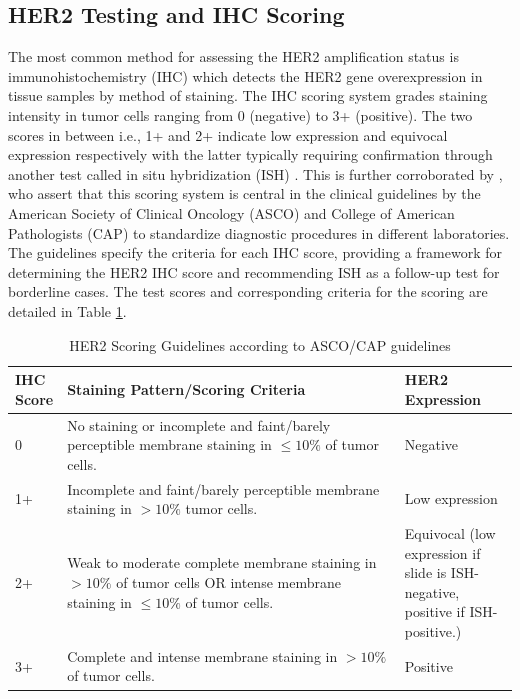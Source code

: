 \subsection{HER2 Testing and IHC Scoring}

The most common method for assessing the HER2 amplification status is immunohistochemistry (IHC) which detects the HER2 gene overexpression in tissue samples by method of staining. The IHC scoring system grades staining intensity in tumor cells ranging from 0 (negative) to 3+ (positive). The two scores in between i.e., 1+ and 2+ indicate low expression and equivocal expression respectively with the latter typically requiring confirmation through another test called in situ hybridization (ISH) \parencite{Ivanova2024StandardizedCancer.}. This is further corroborated by  \textcite{Wolff2018HumanUpdate}, who assert that this scoring system is central in the clinical guidelines by the American Society of Clinical Oncology (ASCO) and College of American Pathologists (CAP) to standardize diagnostic procedures in different laboratories. The guidelines specify the criteria for each IHC score, providing a framework for determining the HER2 IHC  score and recommending ISH as a follow-up test for borderline cases. The test scores and corresponding criteria for the scoring are detailed in Table \ref{tab:HER2 IHC Scoring Guidelines}. 

\begin{table}[H]
\begin{center}
\begin{tabular}{|p{0.07\linewidth}|>{\raggedright\arraybackslash}p{0.7\linewidth}|>{\raggedright\arraybackslash}p{0.23\linewidth}|}
\hline 
\textbf{IHC Score}& \textbf{Staining Pattern/Scoring Criteria}& \textbf{HER2 Expression}\\ \hline 
0& No staining or incomplete and faint/barely perceptible membrane staining in $\leq 10 \% $ of tumor cells.& Negative\\ \hline
1+& Incomplete and faint/barely perceptible membrane staining in $> 10\%$ tumor cells.&  Low expression\\ \hline
2+& Weak to moderate complete membrane staining in $>10\%$ of tumor cells OR intense membrane staining in $\leq 10\%$ of tumor cells.& Equivocal (low expression if slide is ISH-negative, positive if ISH-positive.)\\ \hline
 3+& Complete and intense membrane staining in $> 10\%$ of tumor cells.&Positive\\\hline
\end{tabular}
\caption[HER2 Scoring Guidelines]{HER2 Scoring Guidelines according to ASCO/CAP guidelines \parencite{Ivanova2024StandardizedCancer.}}\label{tab:HER2 IHC Scoring Guidelines}
\end{center}
\end{table}
\vspace{5mm}


